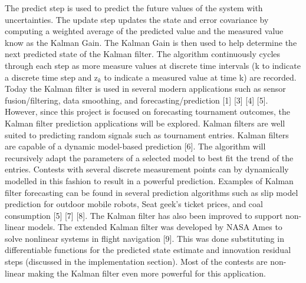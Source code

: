 The predict step is used to predict the future values of the system with uncertainties. The update step updates the state and error covariance by computing a weighted average of the predicted value and the measured value know as the Kalman Gain. The Kalman Gain is then used to help determine the next predicted state of the Kalman filter. The algorithm continuously cycles through each step as more measure values at discrete time intervals (k to indicate a discrete time step and z$_k$ to indicate a measured value at time k) are recorded.
Today the Kalman filter is used in several modern applications such as sensor fusion/filtering, data smoothing, and forecasting/prediction [1] [3] [4] [5]. However, since this project is focused on forecasting tournament outcomes, the Kalman filter prediction applications will be explored. Kalman filters are well suited to predicting random signals such as tournament entries.  Kalman filters are capable of a dynamic model-based prediction [6]. The algorithm will recursively adapt the parameters of a selected model to best fit the trend of the entries. Contests with several discrete measurement points can by dynamically modelled in this fashion to result in a powerful prediction. Examples of Kalman filter forecasting can be found in several prediction algorithms such as slip model prediction for outdoor mobile robots, Seat geek’s ticket prices, and coal consumption [5] [7] [8]. The Kalman filter has also been improved to support non-linear models. The extended Kalman filter was developed by NASA Ames to solve nonlinear systems in flight navigation [9]. This was done substituting in differentiable functions for the predicted state estimate and innovation residual steps (discussed in the implementation section). Most of the contests are non-linear making the Kalman filter even more powerful for this application.
